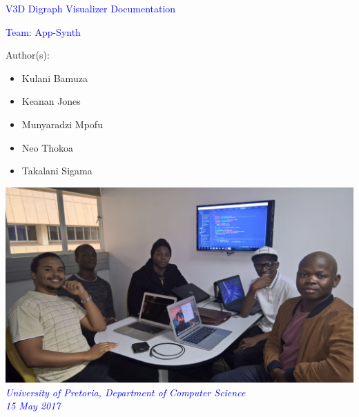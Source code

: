 \documentclass[12pt]{article}
\begin{document}
\begin{titlepage}
\begin{center}
\begin{huge}
\begin{center}
\textcolor{blue}{V3D Digraph Visualizer Documentation}
\end{center}
\end{huge}
\hfill \break
\begin{Large}
\begin{center}
\textcolor{blue}{Team: App-Synth}
\end{center}
\end{Large}
\begin{small}
\begin{flushleft}
Author(s):
\end{flushleft}

\begin{itemize}
	\item Kulani Bamuza \\
	\item Keanan Jones \\
	\item Munyaradzi Mpofu\\
	\item Neo Thokoa\\	
	\item Takalani Sigama\\
	
\end{itemize}
\end{small}

\end{center}
\begin{center}
\includegraphics[scale=0.4]{Dps/TeamPic.jpg}
\\
\textcolor{blue}{\textit{University of Pretoria, Department of Computer Science
\\
15 May 2017}}

\end{center}
\end{titlepage}
\end{document}
